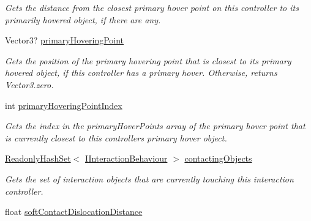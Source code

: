 \begin{DoxyCompactItemize}
\begin{DoxyCompactList}\small\item\em Gets the distance from the closest primary hover point on this controller to its primarily hovered object, if there are any. \end{DoxyCompactList}\item 
Vector3? \mbox{\hyperlink{class_leap_1_1_unity_1_1_interaction_1_1_interaction_controller_a554d29bd982480dc182546ef3ed72c23}{primary\+Hovering\+Point}}
\begin{DoxyCompactList}\small\item\em Gets the position of the primary hovering point that is closest to its primary hovered object, if this controller has a primary hover. Otherwise, returns Vector3.\+zero. \end{DoxyCompactList}\item 
int \mbox{\hyperlink{class_leap_1_1_unity_1_1_interaction_1_1_interaction_controller_aaf9e4b9336f1afd0e0043bc0cffe8aeb}{primary\+Hovering\+Point\+Index}}
\begin{DoxyCompactList}\small\item\em Gets the index in the primary\+Hover\+Points array of the primary hover point that is currently closest to this controller\textquotesingle{}s primary hover object. \end{DoxyCompactList}\item 
\mbox{\hyperlink{struct_leap_1_1_unity_1_1_readonly_hash_set}{Readonly\+Hash\+Set}}$<$ \mbox{\hyperlink{interface_leap_1_1_unity_1_1_interaction_1_1_i_interaction_behaviour}{I\+Interaction\+Behaviour}} $>$ \mbox{\hyperlink{class_leap_1_1_unity_1_1_interaction_1_1_interaction_controller_aa6604231c26a97eeade073ea2dc60d21}{contacting\+Objects}}
\begin{DoxyCompactList}\small\item\em Gets the set of interaction objects that are currently touching this interaction controller. \end{DoxyCompactList}\item 
float \mbox{\hyperlink{class_leap_1_1_unity_1_1_interaction_1_1_interaction_controller_a434834ae5912df87a8a0ac876ed0757c}{soft\+Contact\+Dislocation\+Distance}}

\end{DoxyCompactItemize}
